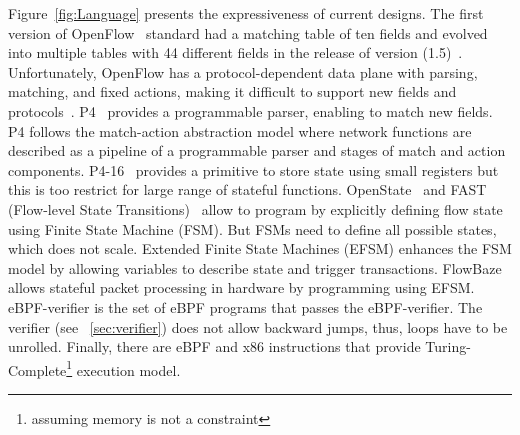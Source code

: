 Figure~\ref{fig:Language} presents the expressiveness of current designs. The first version of OpenFlow~\cite{McKeown:2008:OpenFlow} standard had a matching table of ten fields and evolved into multiple tables with 44 different fields in the release of version (1.5)~\cite{ChristianSurveySDN2015}. Unfortunately, OpenFlow has a protocol-dependent data plane with parsing, matching, and fixed actions, making it difficult to support new fields and 
protocols~\cite{Jouet:2017:BPFabric}.
P4~\cite{Bosshart:2014:P4} provides a programmable parser, enabling to match new fields. P4 follows the match-action abstraction model where network functions are described as a pipeline of a programmable parser and stages of match and action components. P4-16~\cite{P4-16} provides a primitive to store state using small registers but this is too restrict for large range of stateful functions. OpenState~\cite{Bianchi:2014:OPP:2602204.2602211} and FAST (Flow-level State Transitions)~\cite{Moshref:2014:FST:2620728.2620729} allow to program by explicitly defining flow state using Finite State Machine (FSM). But FSMs need to define all possible states, which does not scale. Extended Finite State Machines (EFSM) enhances the FSM model by allowing variables to describe state and trigger transactions. FlowBaze~\cite{FlowBlaze2019} allows stateful packet processing in hardware by programming using EFSM. eBPF-verifier is the set of eBPF programs that passes the eBPF-verifier. The verifier (see \textsection~\ref{sec:verifier}) does not allow backward jumps, thus, loops have to be unrolled. Finally, there are eBPF and x86 instructions that provide Turing-Complete\footnote{assuming memory is not a constraint} execution model.





